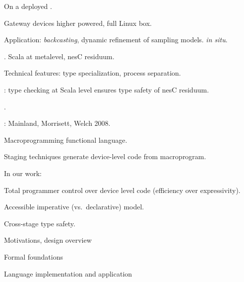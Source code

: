On a deployed .
\begin{citemize}
\item Gateway devices higher powered, full Linux box.
\item Application: \emph{backcasting}, dynamic refinement of sampling models.
\emph{in situ}.
\end{citemize}

\stopslide


\begin{citemize}
\item {}. Scala at metalevel, nesC 
residuum.
\item Technical features: type specialization, process separation.
\item {}: type checking at Scala level ensures
type safety of nesC residuum.
\item {}.
\end{citemize}

\stopslide


: Mainland, Morrisett, Welch 2008.
\begin{citemize}
\item Macroprogramming functional language.
\item Staging techniques generate device-level code from macroprogram.
\end{citemize}
In our work:
\begin{citemize}
\item Total programmer control over device level code (efficiency over expressivity).
\item Accessible imperative (vs.~declarative) model.
\item Cross-stage type safety.
\end{citemize}

\stopslide


\begin{cenumerate}
\item Motivations, design overview
\item {}
\begin{citemize}
\item {} 
\item Formal foundations
\end{citemize}
\item Language implementation and application
\end{cenumerate}

